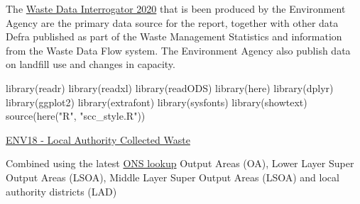 \documentclass[
]{article}
\newenvironment{Shaded}{\begin{snugshade}}{\end{snugshade}}
\newcommand{\FunctionTok}[1]{\textcolor[rgb]{0.00,0.00,0.00}{#1}}
\newcommand{\NormalTok}[1]{#1}
\newcommand{\StringTok}[1]{\textcolor[rgb]{0.31,0.60,0.02}{#1}}
\begin{document}
The
\href{https://www.data.gov.uk/dataset/bb40d091-a346-4b75-aa54-df7d347bed93/2020-waste-data-interrogator}{Waste
Data Interrogator 2020} that is been produced by the Environment Agency
are the primary data source for the report, together with other data
Defra published as part of the Waste Management Statistics and
information from the Waste Data Flow system. The Environment Agency also
publish data on landfill use and changes in capacity.

\begin{Shaded}
\begin{Highlighting}[]
\FunctionTok{library}\NormalTok{(readr)}
\FunctionTok{library}\NormalTok{(readxl)}
\FunctionTok{library}\NormalTok{(readODS)}
\FunctionTok{library}\NormalTok{(here)}
\FunctionTok{library}\NormalTok{(dplyr)}
\FunctionTok{library}\NormalTok{(ggplot2)}
\FunctionTok{library}\NormalTok{(extrafont)}
\FunctionTok{library}\NormalTok{(sysfonts)}
\FunctionTok{library}\NormalTok{(showtext)}
\FunctionTok{source}\NormalTok{(}\FunctionTok{here}\NormalTok{(}\StringTok{"R"}\NormalTok{, }\StringTok{"scc\_style.R"}\NormalTok{))}
\end{Highlighting}
\end{Shaded}

\href{https://www.gov.uk/government/statistical-data-sets/env18-local-authority-collected-waste-annual-results-tables}{ENV18
- Local Authority Collected Waste}

Combined using the latest
\href{https://geoportal.statistics.gov.uk/datasets/output-area-to-lower-layer-super-output-area-to-middle-layer-super-output-area-to-local-authority-district-december-2021-lookup-in-england-and-wales-v2/about}{ONS
lookup} Output Areas (OA), Lower Layer Super Output Areas (LSOA), Middle
Layer Super Output Areas (LSOA) and local authority districts (LAD)
\end{document}
